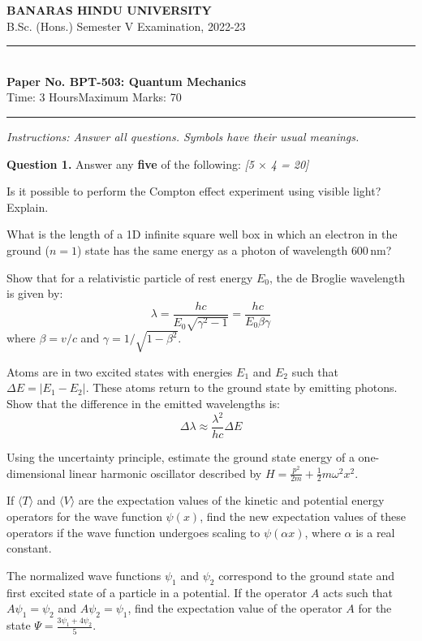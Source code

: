 \documentclass[11pt,a4paper]{article}
\newcommand{\pts}[1]{\hfill   \textit{[#1]}}
\begin{document}
\begin{center}
  {\large\bfseries BANARAS HINDU UNIVERSITY}\\[2pt]
  {\normalsize B.Sc. (Hons.) Semester V Examination, 2022-23}\\[6pt]
  \rule{0.8\linewidth}{0.5pt}\\[6pt]
  {\large\bfseries Paper No. BPT-503: Quantum Mechanics}\\[4pt]
  {\normalsize Time: 3 Hours\hfill Maximum Marks: 70}
\end{center}
\rule{\linewidth}{0.4pt}
\smallskip



\noindent   \textit{Instructions: Answer all questions. Symbols have their usual meanings.}
\bigskip




\noindent   \textbf{Question 1.} Answer any   \textbf{five} of the following: \pts{5 $ \times$ 4 = 20}

\begin{parts}
  \item Is it possible to perform the Compton effect experiment using visible light? Explain.
  \item What is the length of a 1D infinite square well box in which an electron in the ground ($n=1$) state has the same energy as a photon of wavelength $600\, \text{nm}$?
  \item Show that for a relativistic particle of rest energy $E_0$, the de Broglie wavelength is given by:
    \[ \lambda = \frac{hc}{E_0 \sqrt{\gamma^2 - 1}} = \frac{hc}{E_0 \beta \gamma} \]
    where $\beta = v/c$ and $\gamma = 1/\sqrt{1-\beta^2}$.
  \item Atoms are in two excited states with energies $E_1$ and $E_2$ such that $\Delta E = |E_1 - E_2|$. These atoms return to the ground state by emitting photons. Show that the difference in the emitted wavelengths is:
    \[ \Delta\lambda \approx \frac{\lambda^2}{hc} \Delta E \]
  \item Using the uncertainty principle, estimate the ground state energy of a one-dimensional linear harmonic oscillator described by $H = \frac{p^2}{2m} + \frac{1}{2}m\omega^2 x^2$.
  \item If $\langle T \rangle$ and $\langle V \rangle$ are the expectation values of the kinetic and potential energy operators for the wave function $\psi(x)$, find the new expectation values of these operators if the wave function undergoes scaling to $\psi(\alpha x)$, where $\alpha$ is a real constant.
  \item The normalized wave functions $\psi_1$ and $\psi_2$ correspond to the ground state and first excited state of a particle in a potential. If the operator $A$ acts such that $A\psi_1 = \psi_2$ and $A\psi_2 = \psi_1$, find the expectation value of the operator $A$ for the state $\Psi = \frac{3\psi_1 + 4\psi_2}{5}$.
\end{parts}
\end{document}
